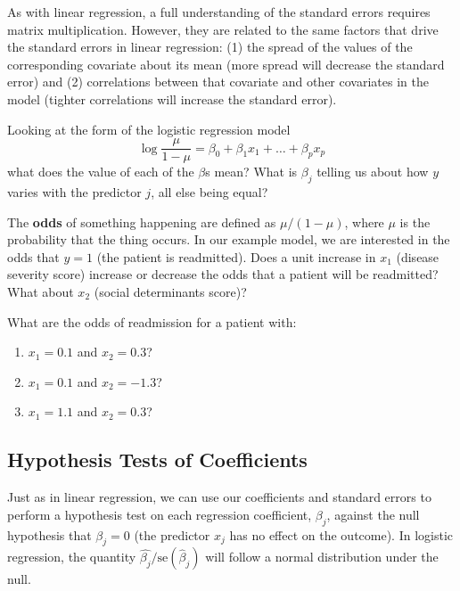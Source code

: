 As with linear regression, a full understanding of the standard errors requires matrix multiplication. However, they are related to the same factors that drive the standard errors in linear regression: (1) the spread of the values of the corresponding covariate about its mean (more spread will decrease the standard error) and (2) correlations between that covariate and other covariates in the model (tighter correlations will increase the standard error).
\vspace{5mm}

\begin{question}{}
Looking at the form of the logistic regression model
$$ \log \frac{\mu}{1-\mu} = \beta_0 + \beta_1 x_1 + \dots + \beta_p x_p $$
what does the value of each of the $\beta$s mean? What is $\beta_j$ telling us about how $y$ varies with the predictor $j$, all else being equal?
\end{question}

\begin{question}{}
The \textbf{odds} of something happening are defined as $\mu/(1-\mu)$, where $\mu$ is the probability that the thing occurs. In our example model, we are interested in the odds that $y=1$ (the patient is readmitted). Does a unit increase in $x_1$ (disease severity score) increase or decrease the odds that a patient will be readmitted? What about $x_2$ (social determinants score)? 
\end{question}

\begin{question}{}
What are the odds of readmission for a patient with:
\begin{enumerate}[label=(\alph*)] 
\item $x_1 = 0.1$ and $x_2 = 0.3$?
\item $x_1 = 0.1$ and $x_2 = -1.3$?
\item $x_1 = 1.1$ and $x_2 = 0.3$?
\end{enumerate}
\end{question}

\subsection{Hypothesis Tests of Coefficients}

Just as in linear regression, we can use our coefficients and standard errors to perform a hypothesis test on each regression coefficient, $\beta_j$, against the null hypothesis that $\beta_j = 0$ (the predictor $x_j$ has no effect on the outcome). In logistic regression, the quantity $\hat{\beta_j}/\text{se}(\hat{\beta}_j)$ will follow a normal distribution under the null.
\vspace{3mm}

